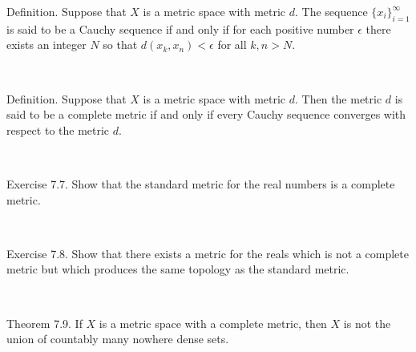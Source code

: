 \documentclass[12pt, std]{article}
\begin{document}
\newpage

Definition.  Suppose that $X$ is a metric space with metric $d$.  The sequence $\{x_i\}_{i=1}^{\infty}$ is said to be a Cauchy sequence if and only if for each positive number $\epsilon$ there exists an integer $N$ so that $d(x_k, x_n) < \epsilon$ for all $k,n > N$.

\

Definition.  Suppose that $X$ is a metric space with metric $d$.  Then the metric $d$ is said to be a complete metric if and only if every Cauchy sequence converges with respect to the metric $d$.

\

Exercise 7.7.  Show that the standard metric for the real numbers is a complete metric.

\

Exercise 7.8.  Show that there exists a metric for the reals which is not a complete metric but which produces the same topology as the standard metric.

\

Theorem 7.9.  If $X$ is a metric space with a complete metric, then $X$ is not the union of countably many nowhere dense sets.
\end{document}
